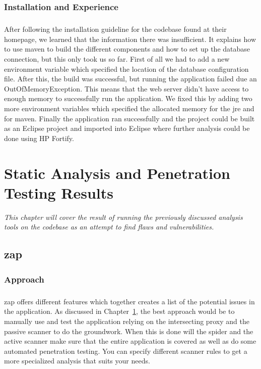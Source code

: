 \documentclass[11pt,english,a4paper]{report}
\begin{document}
\subsection{Installation and Experience}
\paragraph{}
After following the installation guideline for the codebase found at their homepage, we learned that the information there was insufficient.
It explains how to use \gls{maven} to build the different components and how to set up the database connection, but this only took us so far.
First of all we had to add a new environment variable which specified the location of the database configuration file.
After this, the build was successful, but running the application failed due an OutOfMemoryException. 
This means that the web server didn't have access to enough memory to successfully run the application. 
We fixed this by adding two more environment variables which specified the allocated memory for the \gls{jre} and for \gls{maven}.
Finally the application ran successfully and the project could be built as an Eclipse project and imported into Eclipse where further analysis could be done using HP Fortify.




\chapter{Static Analysis and Penetration Testing Results}
\label{cha:part2}
\textit{This chapter will cover the result of running the previously discussed analysis tools on the codebase as an attempt to find flaws and vulnerabilities.}

\section{\gls{zap}}
\subsection{Approach}
\paragraph{}
\gls{zap} offers different features which together creates a list of the potential issues in the application. 
As discussed in Chapter~\ref{cha:part2}, the best approach would be to manually use and test the application relying on the intersecting proxy and the passive scanner to do the groundwork. 
When this is done will the spider and the active scanner make sure that the entire application is covered as well as do some automated penetration testing. 
You can specify different scanner rules to get a more specialized analysis that suits your needs.
\end{document}
